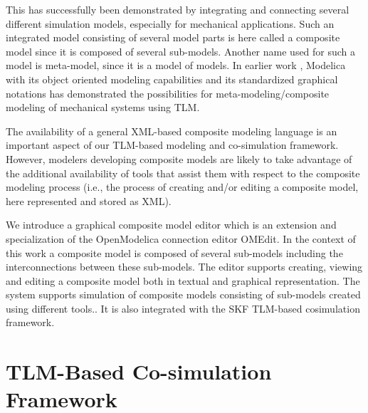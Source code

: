 This has successfully been demonstrated by integrating and connecting several different simulation
models, especially for mechanical applications. Such an integrated model consisting of several model parts
is here called a composite model since it is composed of several sub-models. Another name used for such a
model is meta-model, since it is a model of models. In earlier work \cite{tlmalexander05,tlmsiemers06}, Modelica with its object oriented modeling capabilities and its standardized graphical notations has demonstrated the possibilities for meta-modeling/composite modeling of
mechanical systems using TLM.

The availability of a general XML-based composite modeling language \cite{tlmalexander05} is an
important aspect of our TLM-based modeling and co-simulation framework. However, modelers
developing composite models are likely to take advantage of the additional availability of tools that
assist them with respect to the composite modeling process (i.e., the process of creating and/or editing a
composite model, here represented and stored as XML). 

We introduce a graphical composite model editor which is an extension and specialization of the
OpenModelica connection editor OMEdit. In the context of this work a composite
model is composed of several sub-models including the interconnections between these sub-models. 
The editor supports creating, viewing and editing a composite model both in textual and graphical representation. 
The system supports simulation of composite models consisting of sub-models created using different tools.. It is also integrated
with the SKF TLM-based cosimulation framework.

\section{TLM-Based Co-simulation Framework}
\label{sec:tlmframework}

